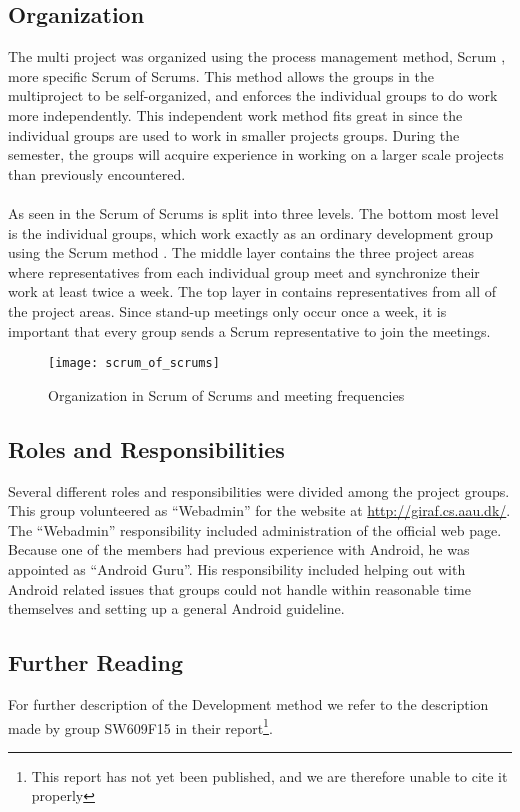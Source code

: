 \subsection{Organization}
The multi project was organized using the process management method, Scrum \parencite{scrum}, more specific Scrum of Scrums. This method allows the groups in the multiproject to be self-organized, and enforces the individual groups to do work more independently. This independent work method fits great in since the individual groups are used to work in smaller projects groups. During the semester, the groups will acquire experience in working on a larger scale projects than previously encountered.
\\\\
As seen in  the Scrum of Scrums is split into three levels. The bottom most level is the individual groups, which work exactly as an ordinary development group using the Scrum method . The middle layer contains the three project areas where representatives from each individual group meet and synchronize their work at least twice a week. The top layer in  contains representatives from all of the project areas. Since stand-up meetings only occur once a week, it is important that every group sends a Scrum representative to join the meetings.

\begin{figure}[!htbp]
  \centering
    \texttt{[image: scrum\_of\_scrums]}
    \caption{Organization in Scrum of Scrums and meeting frequencies}
    \label{fig:scrum_of_scrums}
\end{figure}

\subsection{Roles and Responsibilities}
Several different roles and responsibilities were divided among the project groups. This group volunteered as ``Webadmin'' for the website at \url{http://giraf.cs.aau.dk/}. The ``Webadmin'' responsibility included administration of the official \giraf web page. Because one of the members had previous experience with Android, he was appointed as ``Android Guru''. His responsibility included helping out with Android related issues that groups could not handle within reasonable time themselves and setting up a general Android guideline.

\subsection{Further Reading}
For further description of the \giraf Development method we refer to the description made by group SW609F15 in their report\footnote{This report has not yet been published, and we are therefore unable to cite it properly}.